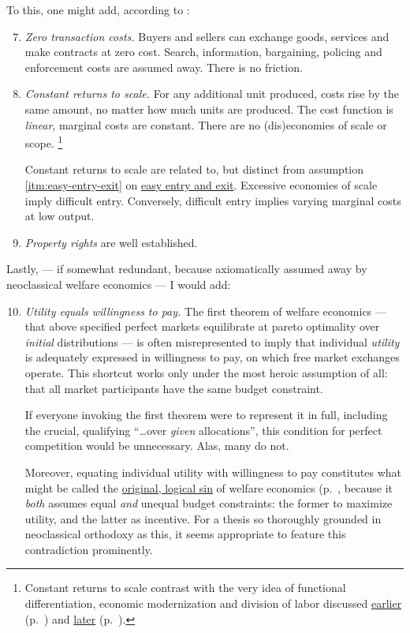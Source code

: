 To this, one might add, according to \citeauthor{Wikipedia2012}:
\begin{enumerate} \setcounter{enumi}{6}
	\item \emph{Zero transaction costs.} \label{itm:zero-transaction-costs}
		Buyers and sellers can exchange goods, services and make contracts at zero cost.
		Search, information, bargaining, policing and enforcement costs are assumed away.
		There is no friction.
	\item \emph{Constant returns to scale.} \label{itm:constant-returns-to-scale}
		For any additional unit produced, costs rise by the same amount, no matter how much units are produced.
		The cost function is \emph{linear}, marginal costs are constant.
		There are no (dis)economies of scale or scope.
		\footnote{
			Constant returns to scale contrast with the very idea of functional differentiation, economic modernization and division of labor discussed \hyperref[sec:modernity]{earlier} (p.~\pageref{sec:modernity}) and \hyperref[sec:growth-solidarity]{later} (p.~\pageref{sec:growth-solidarity}).
		}

		Constant returns to scale are related to, but distinct from assumption \ref{itm:easy-entry-exit} on \hyperref[itm:easy-entry-exit]{easy entry and exit}.
		Excessive economies of scale imply difficult entry.
		Conversely, difficult entry implies varying marginal costs at low output.
	\item \emph{Property rights} \label{itm:property-rights} are well established.
\end{enumerate}

Lastly, --- if somewhat redundant, because axiomatically assumed away by neoclassical welfare economics --- I would add:

\begin{enumerate}\setcounter{enumi}{9}
	\item \emph{Utility equals willingness to pay.} \label{itm:same-budgets}
	The first theorem of welfare economics --- that above specified perfect markets equilibrate at pareto optimality over \emph{initial} distributions --- is often misrepresented to imply that individual \emph{utility} is adequately expressed in willingness to pay, on which free market exchanges operate.
	This shortcut works only under the most heroic assumption of all:
that all market participants have the same budget constraint.

	If everyone invoking the first theorem were to represent it in full, including the crucial, qualifying ``\ldots over \emph{given} allocations'', this condition for perfect competition would be unnecessary.
	Alas, many do not.

	Moreover, equating individual utility with willingness to pay constitutes what might be called the \hyperref[sec:different-budget-constraints]{original, logical sin} of welfare economics (p.~\pageref{sec:different-budget-constraints}, because it \emph{both} assumes equal \emph{and} unequal budget constraints:
the former to maximize utility, and the latter as incentive.
	For a thesis so thoroughly grounded in neoclassical orthodoxy as this, it seems appropriate to feature this contradiction prominently.
\end{enumerate}

